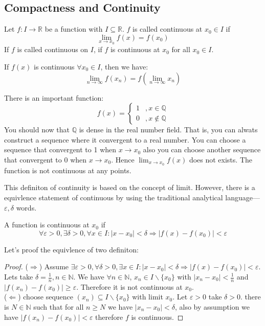 \documentclass{article}
\newcommand{\N}{\mathbb{N}}
\newcommand{\R}{\mathbb{R}}
\begin{document}
\subsection{Compactness and Continuity}
\begin{definition}
	Let $f: I \to \R$ be a function with $I \subseteq \R$. $f$ is called continuous at $x_0\in I$ if \begin{equation*}
		\lim_{x\to x_0}f(x)=f(x_0)
	\end{equation*}
	If $f$ is called continuous on $I$, if $f$ is continuous at $x_0$ for all $x_0\in I$. 
\end{definition}
If $f(x)$ is continuous $\forall x_0\in I$, then we have:
\begin{equation*}
	\lim_{n\to \infty}f(x_n) = f(\lim_{n\to \infty}x_n)
\end{equation*}

\begin{example}
	There is an important function:
	\begin{equation*}
		f(x)=\begin{cases}
			1&,x\in \mathbb{Q}\\
			0&,x\notin \mathbb{Q}
		\end{cases}
	\end{equation*}
	You should now that $\mathbb{Q}$ is dense in the real number field. That is, you can alwats construct a sequence where it convergent to a real number. You can choose a sequence that convergent to 1 when $x\to x_0$ also you can choose another sequence that convergent to 0 when $x\to x_0$. Hence $\lim_{x\to x_0}f(x)$ does not exists. The function is not continuous at any points.
\end{example}

This definiton of continuity is based on the concept of limit. However, there is a equivlence statement of continuous by using the traditional analytical language---$\varepsilon,\delta$ words.

A function is continuous at $x_0$ if
\begin{equation*}
	\forall \varepsilon >0,\exists \delta>0, \forall x\in I: |x-x_0|<\delta \Rightarrow |f(x)-f(x_0)|<\varepsilon
\end{equation*}

Let's proof the equivlence of two definiton:
\begin{proof}
	($\Rightarrow$) Assume $\exists \varepsilon >0,\forall \delta>0, \exists x\in I: |x-x_0|<\delta \Rightarrow |f(x)-f(x_0)|<\varepsilon$. Lets take $\delta=\frac{1}{n},n\in \N$. We have $\forall n\in \N$, $x_n\in I\backslash \{x_0\}$ with $|x_n-x_0|<\frac{1}{n}$ and $|f(x_n)-f(x_0)|\geq \varepsilon$. Therefore it is not continuous at $x_0$.\\
($\Leftarrow$) choose sequence $(x_n)\subseteq I\backslash \{x_0\}$ with limit $x_0$. Let $\varepsilon>0$ take $\delta>0$. there is $N\in \N$ such that for all $n\geq N$ we have $|x_n - x_0|<\delta$, also by assumption we have $|f(x_n)-f(x_0)|<\varepsilon$ therefore $f$ is continuous.
\end{proof}
\end{document}
